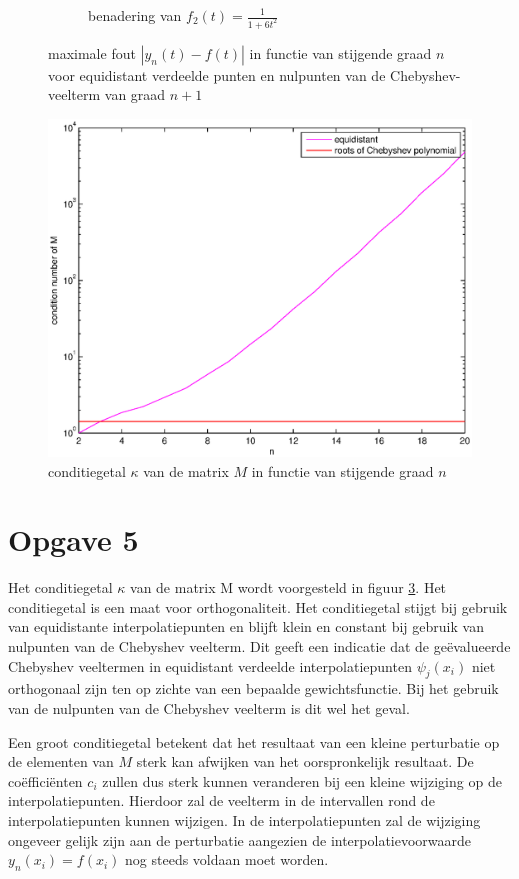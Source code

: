 \documentclass[a4paper]{article}
\newcommand{\opgave}[1]{\section*{Opgave #1}}
\begin{document}
\begin{figure}
\begin{subfigure}[t]{0.45\textwidth}
        \caption{benadering van $f_{2}(t) = \frac{1}{1+6t^{2}}$}
        \label{fig:error_global_f2}
    \end{subfigure}
    \hfill
    \caption{maximale fout $|y_{n}(t)-f(t)|$ in functie van stijgende graad $n$ voor equidistant verdeelde punten en nulpunten van de Chebyshev-veelterm van graad $n+1$}
    \label{fig:error_global}
    \end{figure}
    
\begin{figure}
     \centering
        \includegraphics[width=\textwidth]{Jona/condition_f2.eps}
    \hfill
    \caption{conditiegetal $\kappa$ van de matrix $M$ in functie van stijgende graad $n$}
	\label{fig:condition}
    \end{figure}    
\opgave{5}
Het conditiegetal $\kappa$ van de matrix M wordt voorgesteld in figuur \ref{fig:condition}. Het conditiegetal is een maat voor orthogonaliteit. Het conditiegetal stijgt bij gebruik van equidistante interpolatiepunten en blijft klein en constant bij gebruik van nulpunten van de Chebyshev veelterm.  Dit geeft een indicatie dat de ge\"evalueerde Chebyshev veeltermen in equidistant verdeelde interpolatiepunten $\psi_{j}(x_{i})$ niet orthogonaal zijn ten op zichte van een bepaalde gewichtsfunctie. Bij het gebruik van de nulpunten van de Chebyshev veelterm is dit wel het geval.

Een groot conditiegetal betekent dat het resultaat van een kleine perturbatie op de elementen van $M$ sterk kan afwijken van het oorspronkelijk resultaat. De co\"effici\"enten $c_{i}$ zullen dus sterk kunnen veranderen bij een kleine wijziging op de interpolatiepunten. Hierdoor zal de veelterm in de intervallen rond de interpolatiepunten kunnen wijzigen. In de interpolatiepunten zal de wijziging ongeveer gelijk zijn aan de perturbatie aangezien de interpolatievoorwaarde $y_{n}(x_{i}) = f(x_{i})$ nog steeds voldaan moet worden.
\end{document}
